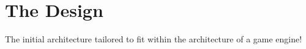 \section{The Design} %
\label{sec:the_design}

The initial architecture tailored to fit within the architecture of a game engine!

